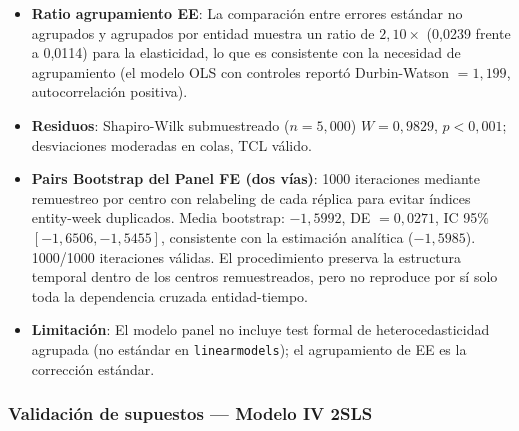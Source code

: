 \documentclass[doc, a4paper, biblatex, floatsintext, longtable, babel]{apa7}
\begin{document}
\begin{itemize}
    \item \textbf{Ratio agrupamiento EE}: La comparaci\'on entre errores est\'andar no agrupados y agrupados por entidad muestra un ratio de $2,10\times$ (0,0239 frente a 0,0114) para la elasticidad, lo que es consistente con la necesidad de agrupamiento (el modelo OLS con controles report\'o Durbin-Watson $=1,199$, autocorrelaci\'on positiva).
    \item \textbf{Residuos}: Shapiro-Wilk submuestreado ($n=5,000$) $W=0,9829$, $p<0,001$; desviaciones moderadas en colas, TCL v\'alido.
    \item \textbf{Pairs Bootstrap del Panel FE (dos vías)}: 1000 iteraciones mediante remuestreo por centro con relabeling de cada réplica para evitar índices entity-week duplicados. Media bootstrap: $-1,5992$, DE $=0,0271$, IC 95\% $[-1,6506,-1,5455]$, consistente con la estimación analítica ($-1,5985$). 1000/1000 iteraciones válidas. El procedimiento preserva la estructura temporal dentro de los centros remuestreados, pero no reproduce por sí solo toda la dependencia cruzada entidad-tiempo.
    \item \textbf{Limitaci\'on}: El modelo panel no incluye test formal de heterocedasticidad agrupada (no est\'andar en \texttt{linearmodels}); el agrupamiento de EE es la correcci\'on est\'andar.
\end{itemize}

\subsubsection{Validaci\'on de supuestos --- Modelo IV 2SLS}
\label{subsec:validacion_iv}
\end{document}
